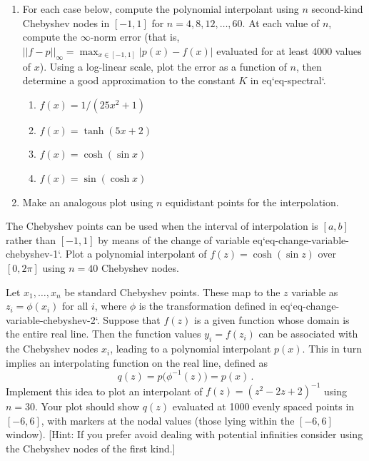 \begin{exercise}
    \begin{enumerate}
        \item For each case below, compute the polynomial interpolant using $n$ second-kind Chebyshev nodes in $[-1,1]$ for $n=4,8,12,\ldots,60$. At each value of $n$, compute the $\infty$-norm error (that is, $||f-p||_\infty=\max_{x\in[-1,1]} |p(x)-f(x)|$ evaluated for at least 4000 values of $x$). Using a log-linear scale, plot the error as a function of $n$, then determine a good approximation to the constant $K$ in {eq}`eq-spectral`. 
        \begin{enumerate}
            \item $f(x) = 1/(25x^2+1)$ 
            \item $f(x) = \tanh(5 x+2)$
            \item $f(x) = \cosh(\sin x)$
            \item $f(x) = \sin(\cosh x)$ 
        \end{enumerate}
        \item Make an analogous plot using $n$ equidistant points for the interpolation.
    \end{enumerate}
\end{exercise}


\begin{exercise}
    The Chebyshev points can be used when the interval of interpolation is $[a,b]$ rather than $[-1,1]$ by means of the change of variable {eq}`eq-change-variable-chebyshev-1`. Plot a polynomial interpolant of $f(z) =\cosh(\sin z)$ over $[0,2\pi]$ using $n=40$ Chebyshev nodes. 
\end{exercise}

\begin{exercise}
    Let $x_1,\ldots,x_n$ be standard Chebyshev points. These map to the $z$ variable as $z_i=\phi(x_i)$ for all $i$, where $\phi$ is the transformation defined in {eq}`eq-change-variable-chebyshev-2`. Suppose that $f(z)$ is a given function whose domain is the entire real line. Then the function values $y_i=f(z_i)$ can be associated with the Chebyshev nodes $x_i$, leading to a polynomial interpolant $p(x)$. This in turn implies an interpolating function on the real line, defined as
    \[
        q(z)=p\bigl(\phi^{-1}(z)\bigr) = p(x)\,.
    \]
    Implement this idea to plot an interpolant of $f(z)=(z^2-2z+2)^{-1}$ using $n=30$. Your plot should show $q(z)$ evaluated at 1000 evenly spaced points in $[-6,6]$, with markers at the nodal values (those lying within the $[-6,6]$ window). [Hint: If you prefer avoid dealing with potential infinities consider using the Chebyshev nodes of the first kind.]
\end{exercise}

